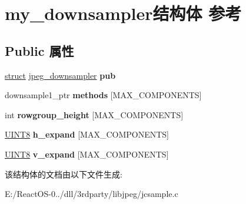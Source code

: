 \hypertarget{structmy__downsampler}{}\section{my\+\_\+downsampler结构体 参考}
\label{structmy__downsampler}
\subsection*{Public 属性}
\begin{DoxyCompactItemize}
\item 
\mbox{\label{structmy__downsampler_a3ace227dd4fd9fdf8e8fe542ca6503c3}} 
\hyperlink{interfacestruct}{struct} \hyperlink{structjpeg__downsampler}{jpeg\+\_\+downsampler} {\bfseries pub}
\item 
\mbox{\label{structmy__downsampler_a6e74bc63d21fbd97d92dc36f65011a75}} 
downsample1\+\_\+ptr {\bfseries methods} \mbox{[}M\+A\+X\+\_\+\+C\+O\+M\+P\+O\+N\+E\+N\+TS\mbox{]}
\item 
\mbox{\label{structmy__downsampler_a60c30dd6034e706ee9d21d0f5f198af7}} 
int {\bfseries rowgroup\+\_\+height} \mbox{[}M\+A\+X\+\_\+\+C\+O\+M\+P\+O\+N\+E\+N\+TS\mbox{]}
\item 
\mbox{\label{structmy__downsampler_a051e236dc44201165b1625621994b86c}} 
\hyperlink{_processor_bind_8h_ab27e9918b538ce9d8ca692479b375b6a}{U\+I\+N\+T8} {\bfseries h\+\_\+expand} \mbox{[}M\+A\+X\+\_\+\+C\+O\+M\+P\+O\+N\+E\+N\+TS\mbox{]}
\item 
\mbox{\label{structmy__downsampler_ab3bc55e23e197c2129ae09c82fb62e83}} 
\hyperlink{_processor_bind_8h_ab27e9918b538ce9d8ca692479b375b6a}{U\+I\+N\+T8} {\bfseries v\+\_\+expand} \mbox{[}M\+A\+X\+\_\+\+C\+O\+M\+P\+O\+N\+E\+N\+TS\mbox{]}
\end{DoxyCompactItemize}


该结构体的文档由以下文件生成\+:\begin{DoxyCompactItemize}
\item 
E\+:/\+React\+O\+S-\/0../dll/3rdparty/libjpeg/jcsample.\+c\end{DoxyCompactItemize}
